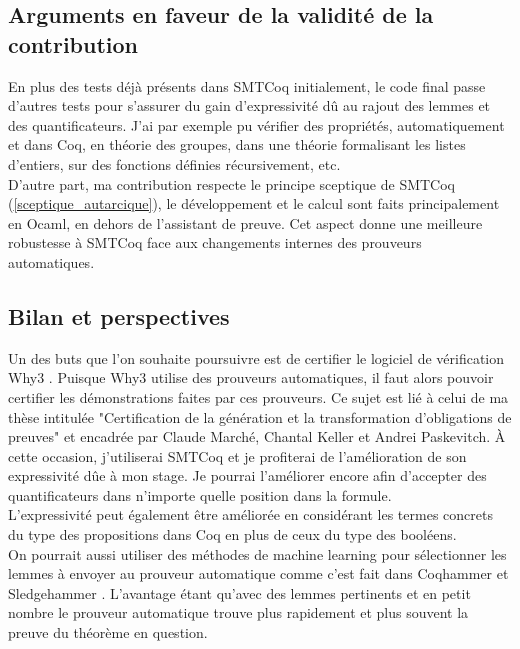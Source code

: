 \documentclass[11pt]{article}
\begin{document}
\subsection{Arguments en faveur de la validité de la contribution}

En plus des tests déjà présents dans SMTCoq initialement, le code final passe d'autres tests pour s'assurer du gain d'expressivité dû au rajout des lemmes et des quantificateurs. J'ai par exemple pu vérifier des propriétés, automatiquement et dans Coq, en théorie des groupes, dans une théorie formalisant les listes d'entiers, sur des fonctions définies récursivement, etc. \\ 

D'autre part, ma contribution respecte le principe sceptique de SMTCoq (\ref{sceptique_autarcique}), le développement et le calcul sont faits principalement en Ocaml, en dehors de l'assistant de preuve. Cet aspect donne une meilleure robustesse à SMTCoq face aux changements internes des prouveurs automatiques.


\subsection{Bilan et perspectives}\label{persp}

Un des buts que l'on souhaite poursuivre est de certifier le logiciel de vérification Why3 \cite{why3_intro}. Puisque Why3 utilise des prouveurs automatiques, il faut alors pouvoir certifier les démonstrations faites par ces prouveurs. Ce sujet est lié à celui de ma thèse intitulée "Certification de la génération et la transformation d'obligations de preuves" et encadrée par Claude Marché, Chantal Keller et Andrei Paskevitch. À cette occasion, j'utiliserai SMTCoq et je profiterai de l'amélioration de son expressivité dûe à mon stage. Je pourrai l'améliorer encore afin d'accepter des quantificateurs dans n'importe quelle position dans la formule.\\
L'expressivité peut également être améliorée en considérant les termes concrets du type des propositions dans Coq en plus de ceux du type des booléens. \\
On pourrait aussi utiliser des méthodes de machine learning pour sélectionner les lemmes à envoyer au prouveur automatique comme c'est fait dans Coqhammer et Sledgehammer \cite{hol_selector, coqhammer}. L'avantage étant qu'avec des lemmes pertinents et en petit nombre le prouveur automatique trouve plus rapidement et plus souvent la preuve du théorème en question.
\end{document}
